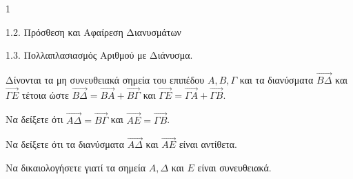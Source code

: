 \begin{ylh}{1}
    \item 1.2. Πρόσθεση και Αφαίρεση Διανυσμάτων
    \item 1.3. Πολλαπλασιασμός Αριθμού με Διάνυσμα.
\end{ylh}
Δίνονται τα μη συνευθειακά σημεία του επιπέδου $A,B,\Gamma$ και τα διανύσματα $\vec{B\Delta}$ και $\vec{\Gamma E}$ τέτοια ώστε $\vec{B\Delta} = \vec{BA} + \vec{B\Gamma}$ και $\vec{\Gamma E} = \vec{\Gamma A} + \vec{\Gamma B}$.

\begin{alist}
\item
    \begin{rlist}
    \item Να δείξετε ότι $\vec{A\Delta} = \vec{B\Gamma}$ και $\vec{AE} = \vec{\Gamma B}$. 
    \item Να δείξετε ότι τα διανύσματα $\vec{A\Delta}$ και $\vec{AE}$ είναι αντίθετα. 
    \end{rlist}
\item Να δικαιολογήσετε γιατί τα σημεία $A, \Delta$ και $E$ είναι συνευθειακά. 
\end{alist}